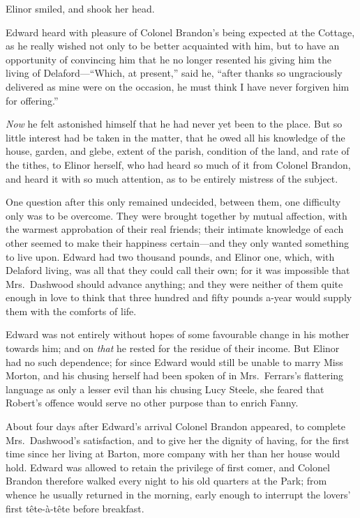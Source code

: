 \documentclass{article}
\begin{document}
Elinor smiled, and shook her head.

Edward heard with pleasure of Colonel Brandon's
being expected at the Cottage, as he really wished
not only to be better acquainted with him, but to have an
opportunity of convincing him that he no longer resented
his giving him the living of Delaford---``Which, at present,''
said he, ``after thanks so ungraciously delivered as mine
were on the occasion, he must think I have never forgiven
him for offering.''

\emph{Now} he felt astonished himself that he had never yet
been to the place.  But so little interest had be taken
in the matter, that he owed all his knowledge of the house,
garden, and glebe, extent of the parish, condition of
the land, and rate of the tithes, to Elinor herself,
who had heard so much of it from Colonel Brandon,
and heard it with so much attention, as to be entirely
mistress of the subject.

One question after this only remained undecided,
between them, one difficulty only was to be overcome.
They were brought together by mutual affection,
with the warmest approbation of their real friends;
their intimate knowledge of each other seemed to make
their happiness certain---and they only wanted something
to live upon.  Edward had two thousand pounds, and Elinor
one, which, with Delaford living, was all that they could
call their own; for it was impossible that Mrs.\ Dashwood
should advance anything; and they were neither of them
quite enough in love to think that three hundred and fifty
pounds a-year would supply them with the comforts of life.

Edward was not entirely without hopes of some
favourable change in his mother towards him; and on \emph{that}
he rested for the residue of their income.  But Elinor
had no such dependence; for since Edward would still
be unable to marry Miss Morton, and his chusing herself
had been spoken of in Mrs.\ Ferrars's flattering language
as only a lesser evil than his chusing Lucy Steele,
she feared that Robert's offence would serve no other
purpose than to enrich Fanny.

About four days after Edward's arrival Colonel
Brandon appeared, to complete Mrs.\ Dashwood's satisfaction,
and to give her the dignity of having, for the first time
since her living at Barton, more company with her than
her house would hold.  Edward was allowed to retain the
privilege of first comer, and Colonel Brandon therefore
walked every night to his old quarters at the Park;
from whence he usually returned in the morning, early enough
to interrupt the lovers' first t\^{e}te-\`{a}-t\^{e}te before breakfast.
\end{document}
